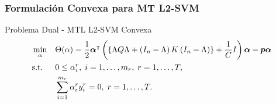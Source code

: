 \documentclass{beamer}
\newcommand{\upper}[1]{\expandafter\MakeUppercase\expandafter{#1}}
\newcommand{\mymat}[1]{\upper{#1}}
\newcommand{\myvec}[1]{\bm{#1}}
\newcommand{\fv}[1]{\myvec{#1}}
\newcommand{\fm}[1]{\mymat{#1}}
\newcommand{\dotp}[2]{\bm{\left\langle} #1, #2 \bm{\right\rangle}}
\newcommand{\nsamples}{n}
\newcommand{\ntasks}{T}
\newcommand{\npertask}{m}
\begin{document}




\begin{frame}
      \frametitle{Formulación Convexa para MT L2-SVM}
  
      \begin{block}{Problema Dual - MTL L2-SVM Convexa}
            \begin{equation}\nonumber
                  \begin{aligned}
                  & \min_{\alpha} && \Theta(\alpha) = \frac{1}{2} \fv{\alpha}^\intercal \left( \left\lbrace \Lambda \fm{Q} \Lambda + \left(\fm{I}_{\nsamples} - \Lambda \right) \fm{K} \left(\fm{I}_{\nsamples} - \Lambda \right) \right\rbrace + \frac{1}{C} \fm{I} \right) \fv{\alpha} - \fv{p} \fv{\alpha} \\
                  & \text{s.t.}
                  & & 0 \leq \alpha_i^r , \; i=1, \ldots, \npertask_r,\; r=1, \ldots, \ntasks, \\
                  & & & \sum_{i=1}^{m_r} \alpha_i^r y_i^r = 0, \;  r=1, \ldots, \ntasks . \\
                  \end{aligned}
              \end{equation}
      \end{block}

  \end{frame}
\end{document}

